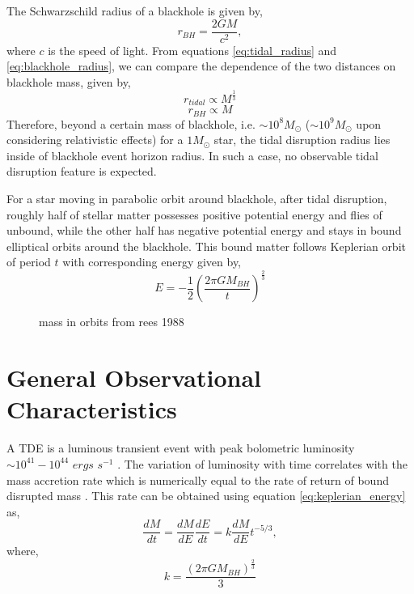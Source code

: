 \documentclass{tda}
\begin{document}
\noindent The Schwarzschild radius of a blackhole is given by,
\begin{equation}
	r_{BH} = \frac{2GM}{c^2},
	\label{eq:blackhole_radius}
\end{equation}
where \(c\) is the speed of light. From equations \ref{eq:tidal_radius} and \ref{eq:blackhole_radius}, we can compare the dependence of the two distances on blackhole mass, given by,
\begin{equation}
	r_{tidal} \propto M^\frac{1}{3}
	\label{eq:tidal_radius_proportionality}
\end{equation}
\begin{equation}
	r_{BH} \propto M
	\label{eq:blackhole_radius_proportionality}
\end{equation}
Therefore, beyond a certain mass of blackhole, i.e. \(\sim10^8 M_{\odot}\) (\(\sim10^9 M_{\odot}\) upon considering relativistic effects) for a \(1 M_{\odot}\) star, the tidal disruption radius lies inside of blackhole event horizon radius. In such a case, no observable tidal disruption feature is expected.

For a star moving in parabolic orbit around blackhole, after tidal disruption, roughly half of stellar matter possesses positive potential energy and flies of unbound, while the other half has negative potential energy and stays in bound elliptical orbits around the blackhole. This bound matter follows Keplerian orbit of period \(t\) with corresponding energy given by,
\begin{equation}
	E = -\frac{1}{2} \left( \frac{2 \pi G M_{BH}}{t} \right)^\frac{2}{3}
	\label{eq:keplerian_energy}
\end{equation}

\begin{figure}
	\caption{mass in orbits from rees 1988}
\end{figure}


\section{General Observational Characteristics}

A TDE is a luminous transient event with peak bolometric luminosity \(\sim 10^{41} - 10^{44}\) \(ergs\) \(s^{-1}\) \cite{lodato_multiband_2011, bonnerot_simulating_2020}. The variation of luminosity with time correlates with the mass accretion rate which is numerically equal to the rate of return of bound disrupted mass \cite{phinney_manifestations_1989}. This rate can be obtained using equation \ref{eq:keplerian_energy} as,
\begin{equation}
	\frac{dM}{dt} = \frac{dM}{dE} \frac{dE}{dt} = k \frac{dM}{dE} t^{-5/3},
	\label{eq:tde_luminosity_time}
\end{equation}
where, \[k=\frac{\left({2 \pi G M_{BH}}\right)^{\frac{2}{3}}}{3}\]
\end{document}
